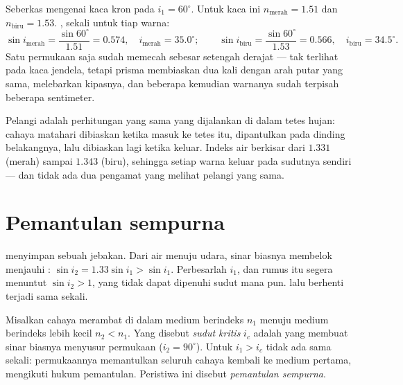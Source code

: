 \begin{example}\label{ex:g10:refraction:twocolors}
Seberkas  mengenai kaca kron pada $i_1 = 60^\circ$. Untuk
kaca ini $n_{\text{merah}} = 1.51$ dan $n_{\text{biru}} = 1.53$. , sekali untuk tiap warna:
\[
\sin i_{\text{merah}} = \frac{\sin 60^\circ}{1.51} = 0.574,
\quad i_{\text{merah}} = 35.0^\circ ;
\qquad
\sin i_{\text{biru}} = \frac{\sin 60^\circ}{1.53} = 0.566,
\quad i_{\text{biru}} = 34.5^\circ .
\]
Satu permukaan saja sudah memecah  sebesar setengah derajat
--- tak terlihat pada kaca jendela, tetapi prisma membiaskan dua kali
dengan arah putar yang sama, melebarkan kipasnya, dan beberapa 
kemudian warnanya sudah terpisah beberapa sentimeter.
\end{example}

\begin{remark}\label{rem:g10:refraction:rainbow}
Pelangi adalah perhitungan yang sama yang dijalankan di dalam tetes
hujan: cahaya matahari dibiaskan ketika masuk ke tetes itu, dipantulkan
pada dinding belakangnya, lalu dibiaskan lagi ketika keluar. Indeks air
berkisar dari $1.331$ (merah) sampai $1.343$ (biru), sehingga setiap
warna keluar pada sudutnya sendiri --- dan tidak ada dua pengamat yang
melihat pelangi yang sama.
\end{remark}

\section{Pemantulan sempurna}

 menyimpan sebuah jebakan. Dari air menuju udara, sinar
biasnya membelok menjauhi :
$\sin i_2 = 1.33 \sin i_1 > \sin i_1$. Perbesarlah $i_1$, dan rumus itu
segera menuntut $\sin i_2 > 1$, yang tidak dapat dipenuhi sudut mana
pun.  lalu berhenti terjadi sama sekali.

\begin{definition}\label{def:g10:refraction:critical}
Misalkan cahaya merambat di dalam medium berindeks $n_1$ menuju medium
berindeks lebih kecil $n_2 < n_1$. Yang disebut \emph{sudut
kritis} $i_c$ adalah  yang membuat sinar
biasnya menyusur permukaan ($i_2 = 90^\circ$). Untuk $i_1 > i_c$ tidak
ada  sama sekali: permukaannya memantulkan seluruh cahaya
kembali ke medium pertama, mengikuti hukum pemantulan. Peristiwa ini
disebut \emph{pemantulan sempurna}.
\end{definition}

